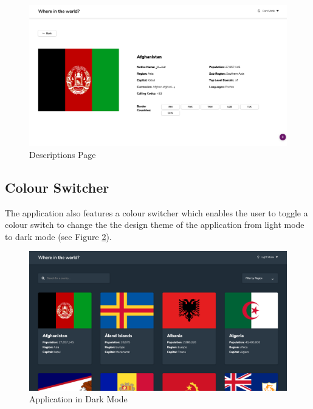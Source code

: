 \documentclass[twoside, a4paper, 12pt]{report}
\begin{document}
\begin{figure}
	\centering
	\includegraphics[width=1.0\textwidth]{DescriptionsPage.png}
	\caption{Descriptions Page}
	\label{fig:descriptions_page}
\end{figure}

\subsection{Colour Switcher}
The application also features a colour switcher which enables the user to toggle a colour switch to change the the design theme of the application from light mode to dark mode (see Figure \ref{fig:darkmode}).

\begin{figure} [h]
	\centering
	\includegraphics[width=1.0\textwidth]{darkmode.png}
	\caption{Application in Dark Mode}
	\label{fig:darkmode}
\end{figure}

\printbibliography
\end{document}
